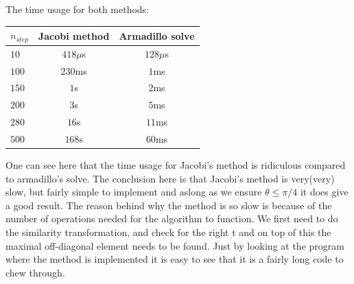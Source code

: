 \documentclass[11pt, a4 paper]{report}
\newenvironment{tabbed}{\begin{addmargin}{0.1cm}}{\end{addmargin}}
\newcommand{\vsp}{\vspace{0.2cm}}
\begin{document}
    \begin{tabbed}    
        The time usage for both methods:
        \begin{center}
        \begin{tabular}{l|c|c}
            $n_{step}$ & Jacobi method & Armadillo solve\\ \hline
            $10$ &$418\mu$s & $128\mu$s\\
            $100$ & $230$ms & $1$ms\\
            $150$ & $1$s & $2$ms\\
            $200$ & $3$s & $5$ms\\
            $280$ & $16$s & $11$ms\\
            $500$ & $168$s & $60$ms
        \end{tabular}
        \end{center}\vsp
        One can see here that the time usage for Jacobi's method is ridiculous compared to armadillo's solve. The conclusion here is that Jacobi's method is very(very) slow, but fairly simple to implement and aslong as we ensure $\theta \leq \pi/4$ it does give a good result. The reason behind why the method is so slow is because of the number of operations needed for the algorithm to function. We first need to do the similarity transformation, and check for the right t and on top of this the maximal off-diagonal element needs to be found. Just by looking at the program where the method is implemented it is easy to see that it is a fairly long code to chew through.
    \end{tabbed}
\end{document}
